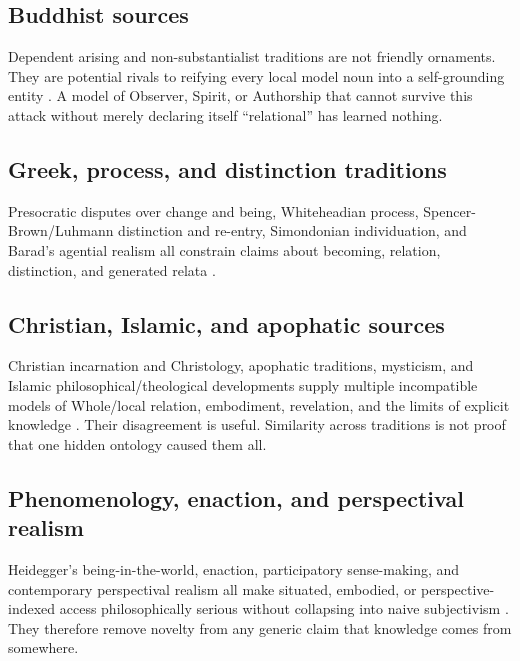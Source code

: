 \documentclass[11pt]{article}
\begin{document}
\subsection{Buddhist sources}

Dependent arising and non-substantialist traditions are not friendly ornaments. They are potential rivals to reifying every local model noun into a self-grounding entity \cite{SEPBuddha2024}. A model of Observer, Spirit, or Authorship that cannot survive this attack without merely declaring itself ``relational'' has learned nothing.

\subsection{Greek, process, and distinction traditions}

Presocratic disputes over change and being, Whiteheadian process, Spencer-Brown/Luhmann distinction and re-entry, Simondonian individuation, and Barad's agential realism all constrain claims about becoming, relation, distinction, and generated relata \cite{SEPPresocratics2020,SEPParmenides2025,Whitehead1978Process,SpencerBrown1969,Luhmann2006Difference,Simondon2020Individuation,Barad2007}.

\subsection{Christian, Islamic, and apophatic sources}

Christian incarnation and Christology, apophatic traditions, mysticism, and Islamic philosophical/theological developments supply multiple incompatible models of Whole/local relation, embodiment, revelation, and the limits of explicit knowledge \cite{SEPChristianTheology2022,SEPPseudoDionysius2019,SEPMysticism2025,SEPArabicIslamicNatural2022,SEPIbnSinaNatural2025,SEPPhenomenologyReligion2024}. Their disagreement is useful. Similarity across traditions is not proof that one hidden ontology caused them all.

\subsection{Phenomenology, enaction, and perspectival realism}

Heidegger's being-in-the-world, enaction, participatory sense-making, and contemporary perspectival realism all make situated, embodied, or perspective-indexed access philosophically serious without collapsing into naive subjectivism \cite{Heidegger2026BeingTime,SEPHeidegger2025,DeJaegherDiPaolo2007Participatory,Massimi2022Perspectival}. They therefore remove novelty from any generic claim that knowledge comes from somewhere.
\end{document}
